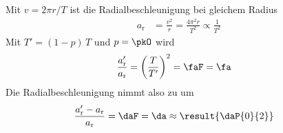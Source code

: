 Mit $v = 2\pi r/T$ ist die Radialbeschleunigung bei gleichem Radius
\begin{align}
 a_\text{r} &= \frac{v^2}{r} = \frac{4\pi^2 r}{T^2} \propto \frac{1}{T^2}
\end{align}
Mit $T' = (1-p)\,T$ und $p = \pkO$ wird
\begin{align}
 \frac{a_\text{r}'}{a_\text{r}} &= \left(\frac{T}{T'}\right)^2 = \faF = \fa
\end{align}
Die Radialbeschleunigung nimmt also zu um
\begin{align}
 \frac{a_\text{r}'-a_\text{r}}{a_\text{r}} &= \daF = \da \approx \result{\daP{0}{2}}
\end{align}
